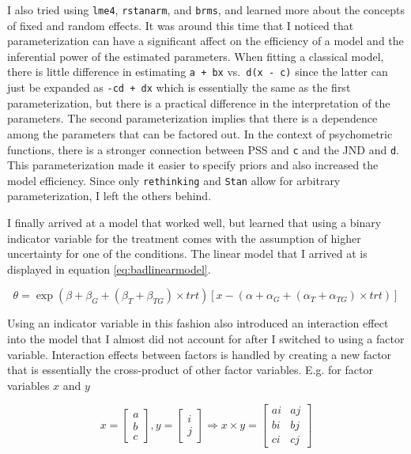 \documentclass[11pt, oneside, openany]{scrbook}
\begin{document}
I also tried using \texttt{lme4}, \texttt{rstanarm}, and \texttt{brms}, and learned more about the concepts of fixed and random effects. It was around this time that I noticed that parameterization can have a significant affect on the efficiency of a model and the inferential power of the estimated parameters. When fitting a classical model, there is little difference in estimating \texttt{a\ +\ bx} vs.~\texttt{d(x\ -\ c)} since the latter can just be expanded as \texttt{-cd\ +\ dx} which is essentially the same as the first parameterization, but there is a practical difference in the interpretation of the parameters. The second parameterization implies that there is a dependence among the parameters that can be factored out. In the context of psychometric functions, there is a stronger connection between PSS and \texttt{c} and the JND and \texttt{d}. This parameterization made it easier to specify priors and also increased the model efficiency. Since only \texttt{rethinking} and \texttt{Stan} allow for arbitrary parameterization, I left the others behind.

I finally arrived at a model that worked well, but learned that using a binary indicator variable for the treatment comes with the assumption of higher uncertainty for one of the conditions. The linear model that I arrived at is displayed in equation \eqref{eq:badlinearmodel}.

\begin{equation}
  \theta = \exp(\beta + \beta_G +(\beta_T + \beta_{TG})\times trt) \left[x - (\alpha + \alpha_G + (\alpha_T + \alpha_{TG})\times trt)\right]
  \label{eq:badlinearmodel}
\end{equation}

Using an indicator variable in this fashion also introduced an interaction effect into the model that I almost did not account for after I switched to using a factor variable. Interaction effects between factors is handled by creating a new factor that is essentially the cross-product of other factor variables. E.g. for factor variables \(x\) and \(y\)

\[
x = \begin{bmatrix}
a \\
b \\
c
\end{bmatrix}, y =  \begin{bmatrix}
i \\
j
\end{bmatrix}\Longrightarrow x\times y = 
\begin{bmatrix}
ai & aj \\
bi & bj \\
ci & cj
\end{bmatrix}
\]
\end{document}
